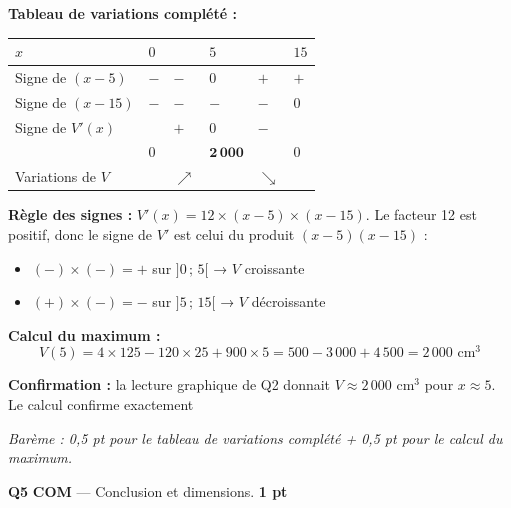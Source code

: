 \documentclass[a4paper,11pt]{article}
\newcommand{\pts}[1]{\hfill\textcolor{gris}{\small\textbf{#1}}}
\newcommand{\comp}[1]{\colorbox{blue!10}{\scriptsize\textbf{#1}}}
\begin{document}
\begin{corrbox}
\textbf{Tableau de variations complété :}

\begin{center}
\renewcommand{\arraystretch}{1.6}
\begin{tabular}{|>{\centering\arraybackslash}m{2.5cm}|>{\centering\arraybackslash}m{1.2cm}|>{\centering\arraybackslash}m{1.8cm}|>{\centering\arraybackslash}m{1.2cm}|>{\centering\arraybackslash}m{1.8cm}|>{\centering\arraybackslash}m{1.2cm}|}
\hline
$x$ & $0$ & & $5$ & & $15$ \\
\hline
Signe de $(x - 5)$ & $-$ & $\boldsymbol{-}$ & $0$ & $\boldsymbol{+}$ & $+$ \\
\hline
Signe de $(x - 15)$ & $-$ & $\boldsymbol{-}$ & $-$ & $\boldsymbol{-}$ & $0$ \\
\hline
Signe de $V'(x)$ & & $\boldsymbol{+}$ & $0$ & $\boldsymbol{-}$ & \\
\hline
& $0$ & & $\boldsymbol{2\,000}$ & & $0$ \\[-2pt]
Variations de $V$ & & $\nearrow$ & & $\searrow$ & \\
\hline
\end{tabular}
\renewcommand{\arraystretch}{1}
\end{center}

\textbf{Règle des signes :} $V'(x) = 12 \times (x-5) \times (x-15)$. Le facteur 12 est positif, donc le signe de $V'$ est celui du produit $(x-5)(x-15)$ :
\begin{itemize}[nosep]
  \item $(-) \times (-) = +$ sur $]0\,;\,5[$ → $V$ croissante
  \item $(+) \times (-) = -$ sur $]5\,;\,15[$ → $V$ décroissante
\end{itemize}

\textbf{Calcul du maximum :}
\[
V(5) = 4 \times 125 - 120 \times 25 + 900 \times 5 = 500 - 3\,000 + 4\,500 = \boxed{2\,000 \text{ cm}^3}
\]

\textbf{Confirmation :} la lecture graphique de Q2 donnait $V \approx 2\,000$ cm$^3$ pour $x \approx 5$. Le calcul confirme exactement \checkmark

\smallskip
\textit{Barème : 0,5 pt pour le tableau de variations complété + 0,5 pt pour le calcul du maximum.}
\end{corrbox}

\textbf{Q5} \comp{COM} — Conclusion et dimensions. \pts{1 pt}
\end{document}
